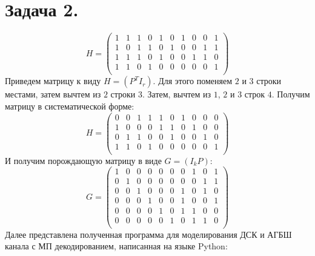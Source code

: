 \documentclass{article}
\begin{document}
\section{Задача 2.}
%
$$H=
\begin{pmatrix}
1 & 1 & 1 & 0 & 1 & 0 & 1 & 0 & 0 & 1 \\
1 & 0 & 1 & 1 & 0 & 1 & 0 & 0 & 1 & 1 \\
1 & 1 & 1 & 0 & 1 & 0 & 0 & 1 & 1 & 0 \\
1 & 1 & 0 & 1 & 0 & 0 & 0 & 0 & 0 & 1 \\
\end{pmatrix}$$
%
Приведем матрицу к виду $H=(P^{T} I_{r})$. Для этого поменяем $2$ и $3$ строки местами, затем вычтем из $2$ строки $3$. Затем, вычтем из $1$, $2$ и $3$ строк $4$. Получим матрицу в систематической форме:
$$H=
\begin{pmatrix}
0 &	0 & 1 & 1 & 1 & 0 & 1 & 0 & 0 & 0 \\	
1 & 0 & 0 & 0 & 1 & 1 & 0 & 1 & 0 & 0 \\
0 & 1 & 1 & 0 & 0 & 1 & 0 & 0 & 1 & 0 \\
1 & 1 & 0 & 1 & 0 & 0 & 0 & 0 & 0 & 1 \\
\end{pmatrix}$$ 
И получим порождающую матрицу в виде $G=(I_{k} P)$:
$$G=
\begin{pmatrix}
1 &	0 &	0 &	0 &	0 &	0 &	0 &	1 &	0 &	1 \\
0 &	1 &	0 &	0 &	0 &	0 &	0 &	0 &	1 &	1 \\	
0 &	0 &	1 &	0 &	0 &	0 &	1 &	0 &	1 &	0 \\	
0 &	0 &	0 &	1 &	0 &	0 &	1 &	0 &	0 &	1 \\	
0 &	0 &	0 &	0 &	1 &	0 &	1 &	1 &	0 &	0 \\	
0 &	0 &	0 &	0 &	0 &	1 &	0 &	1 &	1 &	0 \\
\end{pmatrix}$$
Далее представлена полученная программа для моделирования ДСК и АГБШ канала с МП декодированием, написанная на языке Python:
\end{document}
